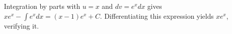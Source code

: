 Integration by parts with $u=x$ and $dv=e^x dx$ gives $xe^x-\int e^x dx=\boxed{(x-1)e^x+C}$. Differentiating this expression yields $xe^x$, verifying it.
